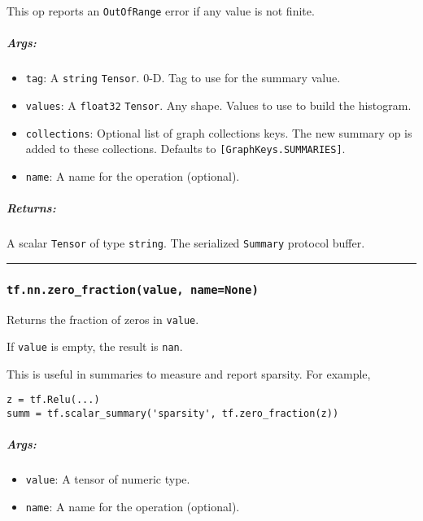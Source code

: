 This op reports an \texttt{OutOfRange} error if any value is not finite.

\subparagraph{Args: }\label{args-32}

\begin{itemize}
\tightlist
\item
  \texttt{tag}: A \texttt{string} \texttt{Tensor}. 0-D. Tag to use for
  the summary value.
\item
  \texttt{values}: A \texttt{float32} \texttt{Tensor}. Any shape. Values
  to use to build the histogram.
\item
  \texttt{collections}: Optional list of graph collections keys. The new
  summary op is added to these collections. Defaults to
  \texttt{{[}GraphKeys.SUMMARIES{]}}.
\item
  \texttt{name}: A name for the operation (optional).
\end{itemize}

\subparagraph{Returns: }\label{returns-23}

A scalar \texttt{Tensor} of type \texttt{string}. The serialized
\texttt{Summary} protocol buffer.

\begin{center}\rule{0.5\linewidth}{\linethickness}\end{center}

\subsubsection{\texorpdfstring{\texttt{tf.nn.zero\_fraction(value,\ name=None)}
}{tf.nn.zero\_fraction(value, name=None) }}\label{tf.nn.zeroux5ffractionvalue-namenone}

Returns the fraction of zeros in \texttt{value}.

If \texttt{value} is empty, the result is \texttt{nan}.

This is useful in summaries to measure and report sparsity. For example,

\begin{verbatim}
z = tf.Relu(...)
summ = tf.scalar_summary('sparsity', tf.zero_fraction(z))
\end{verbatim}

\subparagraph{Args: }\label{args-33}

\begin{itemize}
\tightlist
\item
  \texttt{value}: A tensor of numeric type.
\item
  \texttt{name}: A name for the operation (optional).
\end{itemize}

